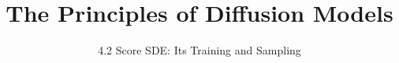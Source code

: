 ﻿%

\graphicspath{{../images/}}
\title{The Principles of Diffusion Models}
\subtitle{4.2 Score SDE: Its Training and Sampling}


\begin{frame}
    \titlepage
\end{frame}


